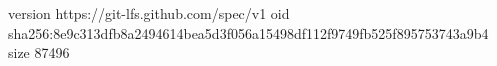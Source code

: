 version https://git-lfs.github.com/spec/v1
oid sha256:8e9c313dfb8a2494614bea5d3f056a15498df112f9749fb525f895753743a9b4
size 87496
